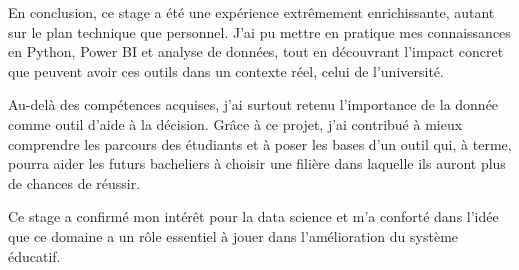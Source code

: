 En conclusion, ce stage a été une expérience extrêmement enrichissante, autant sur le plan technique que personnel. J'ai pu mettre en pratique mes connaissances en Python, Power BI et analyse de données, tout en découvrant l'impact concret que peuvent avoir ces outils dans un contexte réel, celui de l'université.

Au-delà des compétences acquises, j'ai surtout retenu l'importance de la donnée comme outil d'aide à la décision. Grâce à ce projet, j'ai contribué à mieux comprendre les parcours des étudiants et à poser les bases d'un outil qui, à terme, pourra aider les futurs bacheliers à choisir une filière dans laquelle ils auront plus de chances de réussir.

Ce stage a confirmé mon intérêt pour la data science et m'a conforté dans l'idée que ce domaine a un rôle essentiel à jouer dans l'amélioration du système éducatif.